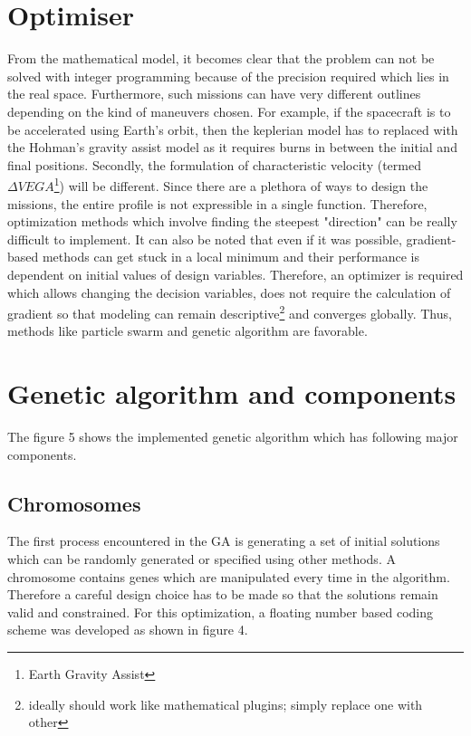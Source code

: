 \documentclass[11pt,a4paper]{article}
\newcommand*\ruleline[1]{\par\noindent\raisebox{.8ex}{\makebox[\linewidth]{\hrulefill\hspace{1ex}\raisebox{-.8ex}{#1}\hspace{1ex}\hrulefill}}}
\DeclareRobustCommand{\mysymb}{{\usefont{U}{MnSymbolC}{m}{n}\symbol{"36}}}
\begin{document}
\ruleline{\mysymb{} }
\begin{multicols}{2}
\section{Optimiser}

From the mathematical model, it becomes clear that the problem can not be solved with integer programming because of the precision required which lies in the real space. Furthermore, such missions can have very different outlines depending on the kind of maneuvers chosen. For example, if the spacecraft is to be accelerated using Earth's orbit, then the keplerian model has to replaced with the Hohman's gravity assist model as it requires burns in between the initial and final positions. Secondly, the formulation of characteristic velocity (termed $\Delta VEGA$\footnote{Earth Gravity Assist}) will be different. Since there are a plethora of ways to design the missions, the entire profile is not expressible in a single function. Therefore, optimization methods which involve finding the steepest "direction" can be really difficult to implement. It can also be noted that even if it was possible, gradient-based methods can get stuck in a local minimum and their performance is dependent on initial values of design variables. Therefore, an optimizer is required which allows changing the decision variables, does not require the calculation of gradient so that modeling can remain descriptive\footnote{ideally should work like mathematical plugins; simply replace one with other} and converges globally. Thus, methods like particle swarm and genetic algorithm are favorable.

\section{Genetic algorithm and components}


The figure 5 shows the implemented genetic algorithm which has following major components.

\subsection{Chromosomes}
The first process encountered in the GA is generating a set of initial solutions which can be randomly generated or specified using other methods. A chromosome contains genes which are manipulated every time in the algorithm. Therefore a careful design choice has to be made so that the solutions remain valid and constrained. For this optimization, a floating number based coding scheme was developed as shown in figure 4.


\end{multicols}
\end{document}
